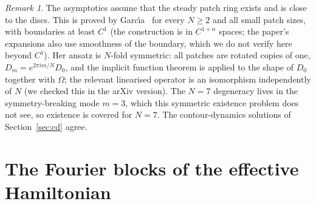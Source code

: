 \documentclass[11pt]{article}
\theoremstyle{definition}
\theoremstyle{remark}
\newtheorem{remark}[theorem]{Remark}
\begin{document}
\begin{remark}\label{rem:existence}
The asymptotics assume that the steady patch ring exists and is close to the discs. This is proved by
Garc\'\i a~\cite[Thm.~1.1]{Garcia2021} for every $N\ge2$ and all small patch sizes, with boundaries at least $C^1$ (the
construction is in $C^{1+\alpha}$ spaces; the paper's expansions also use smoothness of the boundary, which we do not
verify here beyond $C^1$). Her ansatz is $N$-fold symmetric: all patches are rotated copies of one, $D_m=e^{2\pi im/N}D_0$, and
the implicit function theorem is applied to the shape of $D_0$ together with $\Omega$; the relevant linearised operator is
an isomorphism independently of $N$ (we checked this in the arXiv version). The $N=7$ degeneracy lives in the
symmetry-breaking mode $m=3$, which this symmetric existence problem does not see, so existence is covered for $N=7$.
The contour-dynamics solutions of Section~\ref{sec:cd} agree.
\end{remark}

\section{The Fourier blocks of the effective Hamiltonian}\label{sec:blocks}
\end{document}
